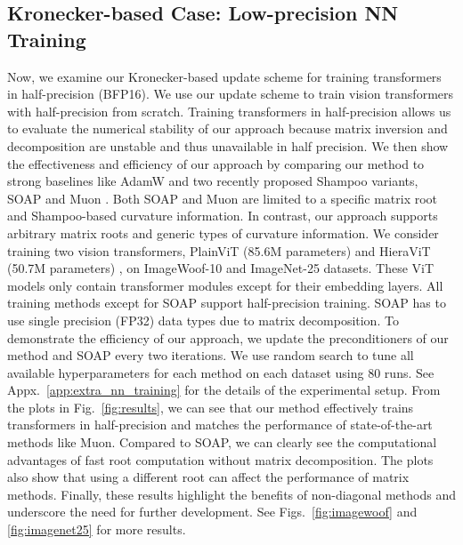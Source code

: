 \subsection{Kronecker-based Case: Low-precision NN Training}
\vspace{-0.2cm}
Now, we examine our Kronecker-based update scheme for training transformers in half-precision (BFP16). We use our update scheme to train vision transformers with half-precision from scratch. 
Training transformers in half-precision allows us to
evaluate the numerical stability of our approach because matrix inversion and decomposition are unstable and thus unavailable in half precision.  
We then show the effectiveness and efficiency of our approach by comparing our method to strong baselines like AdamW and two recently proposed Shampoo variants, SOAP \citep{vyas2024soap} and Muon \citep{muon2024}.
Both SOAP and Muon are limited to a specific matrix root and Shampoo-based curvature information. In contrast, our approach supports arbitrary matrix roots and generic types of curvature information.
We consider training two vision transformers, PlainViT (85.6M parameters) \citep{beyer2022better} and HieraViT (50.7M parameters) \citep{ryali2023hiera}, on ImageWoof-10 and ImageNet-25 datasets. 
These ViT models only contain transformer modules except for their embedding layers.
All training methods except for SOAP support half-precision training. SOAP has to use single precision (FP32) data types due to matrix decomposition.
To demonstrate the efficiency of our approach, we update the preconditioners of our method and SOAP every two iterations.
We use random search \citep{choi2019empirical} to tune all available hyperparameters for each method on each dataset using 80 runs. See Appx.~\ref{app:extra_nn_training} for the details of the experimental setup.
From the plots in  Fig.~\ref{fig:results},  we can see that our method effectively trains transformers in half-precision and matches the performance of state-of-the-art methods like Muon.  
Compared to SOAP, we can clearly see the computational advantages of
fast root computation without matrix decomposition.
The plots also show that using a different root can affect the performance of matrix methods.
Finally, these results highlight the benefits of non-diagonal methods and underscore the need for further development.
See  Figs.~\ref{fig:imagewoof} and \ref{fig:imagenet25}
 for more results.



%
%
%
%
